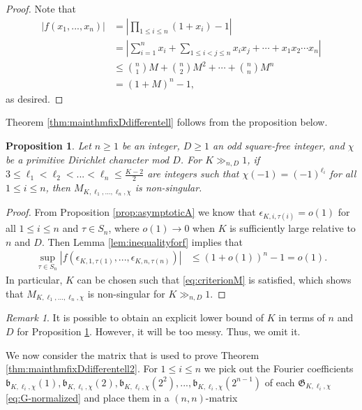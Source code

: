 \documentclass[11pt,letterpaper,reqno]{amsart}
\numberwithin{figure}{section}
\numberwithin{table}{section}
\theoremstyle{definition}
\theoremstyle{plain}
\newtheorem{proposition}[theorem]{Proposition}
\theoremstyle{definition}
\theoremstyle{definition}
\theoremstyle{remark}
\newtheorem{remark}{Remark}[section]
\numberwithin{equation}{section}
\theoremstyle{remark}
\begin{document}
\begin{proof}
    Note that 
    \begin{align}
|f(x_1,...,x_n)|&=\left|\prod_{1\leq i\leq n}(1+x_i)-1\right|  \nonumber\\&=
\left|\sum_{i=1}^nx_{i}+\sum_{1\leq i<j\leq n}x_ix_j+\cdots+x_1x_2\cdots x_n\right|  \nonumber\\&\leq\binom{n}{1}M+\binom{n}{2}M^2+\cdots+\binom{n}{n}M^n  \nonumber\\&=(1+M)^n-1,\label{eq:boundoff}\end{align}
as desired.
\end{proof}
Theorem \ref{thm:mainthmfixDdifferentell} follows from the proposition below.
\begin{proposition}\label{prop:tpyeinonsingular}
   Let $n\geq1$ be an integer, $D\geq1$ an odd square-free integer, and $\chi$ be a primitive Dirichlet character mod $D$. For $K\gg_{n,D}1$, if $3\leq\ell_1<\ell_2<...<\ell_n\leq\frac{K-2}{2}$ are integers such that $\chi(-1)=(-1)^{\ell_i}$ for all $1\leq i\leq n$, then $M_{K,\ell_1,...,\ell_n,\chi}$ is non-singular.
\end{proposition}
\begin{proof} 
From Proposition \ref{prop:asymptoticA} we know that $\epsilon_{K,i,\tau(i)}=o(1)$ for all $1\leq i\leq n$ and $\tau\in S_n$, where $o(1)\rightarrow0$ when $K$ is sufficiently large relative to $n$ and $D$. Then Lemma \ref{lem:inequalityforf} implies that
    \begin{align*}
          \sup_{\tau\in S_n}|f(\epsilon_{K,1,\tau(1)},...,\epsilon_{K,n,\tau(n)})|&\leq(1+o(1))^n-1=o(1).
    \end{align*}
In particular, $K$ can be chosen such that \eqref{eq:criterionM} is satisfied,
 which shows that $M_{K,\ell_1,...,\ell_n,\chi}$ is non-singular for $K\gg_{n,D}1$.
\end{proof}
\begin{remark}
     It is possible to obtain an explicit lower bound of $K$ in terms of $n$ and $D$ for Proposition \ref{prop:tpyeinonsingular}. However, it will be too messy. Thus, we omit it. 
\end{remark}
We now consider the matrix that is used to prove Theorem \ref{thm:mainthmfixDdifferentell2}. For $1\leq i\leq n$ we pick out the Fourier coefficients $\mathfrak{b}_{K,\ell_i,\chi}(1), \mathfrak{b}_{K,\ell_i,\chi}(2), \mathfrak{b}_{K,\ell_i,\chi}(2^2),...,\mathfrak{b}_{K,\ell_i,\chi}(2^{n-1})$ of each $\mathfrak{G}_{K,\ell_i,\chi}$ \eqref{eq:G-normalized} and place them in a $(n,n)$-matrix
\end{document}
